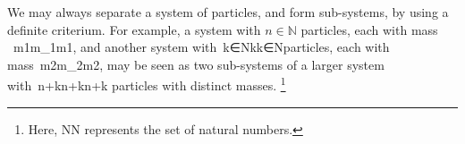 We may always separate a system of particles, and form sub-systems, by using a definite criterium. For example, a system with $n\in\mathbb{N}$ particles, each with mass  m1m_1m1​​, and another system with k∈Nk\in{}k∈N​ particles, each with mass m2m_2m2​​, may be seen as two sub-systems of a larger system with n+kn+kn+k​ particles with distinct masses. \footnote{Here, NN​ represents the set of natural numbers.}